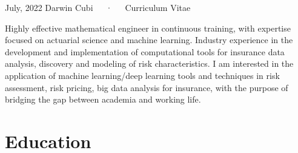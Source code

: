 \documentclass[11pt,a4paper,]{awesome-cv}
\begin{document}
\makecvheader

\makecvfooter
  {July, 2022}
    {Darwin Cubi~~~·~~~Curriculum Vitae}
  {\thepage}





\vspace*{0.5cm}

Highly effective mathematical engineer in continuous training, with
expertise focused on actuarial science and machine learning. Industry
experience in the development and implementation of computational tools
for insurance data analysis, discovery and modeling of risk
characteristics. I am interested in the application of machine
learning/deep learning tools and techniques in risk assessment, risk
pricing, big data analysis for insurance, with the purpose of bridging
the gap between academia and working life.

\hypertarget{education}{%
\section{Education}\label{education}}

\begin{cventries}
\end{cventries}
\end{document}
